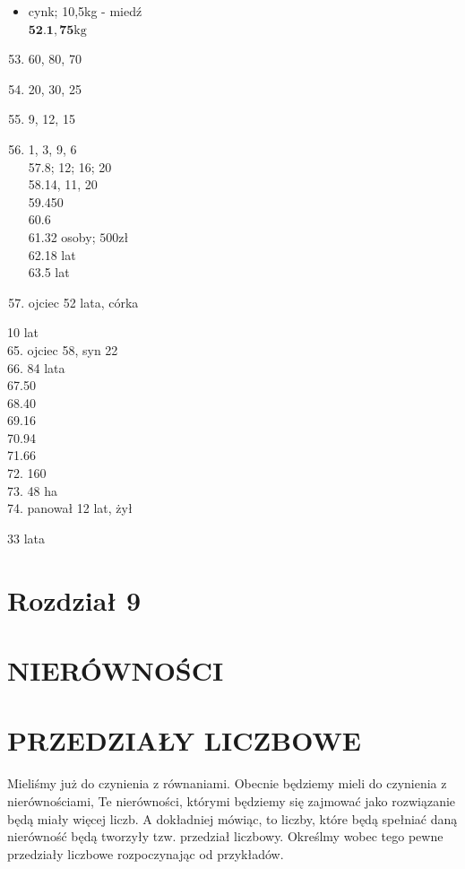 \documentclass[10pt]{article}
\begin{document}
\begin{itemize}
  \item cynk; 10,5kg - miedź\\
\(\mathbf{5 2 . 1 , 7 5 \mathrm { kg }}\)
\end{itemize}

\begin{enumerate}
  \setcounter{enumi}{52}
  \item 60, 80, 70
  \item 20, 30, 25
  \item 9, 12, 15
  \item 1, 3, 9, 6\\
57.8; 12; 16; 20\\
58.14, 11, 20\\
59.450\\
60.6\\
61.32 osoby; \(500 \mathrm{zł}\)\\
62.18 lat\\
63.5 lat
  \item ojciec 52 lata, córka
\end{enumerate}

10 lat\\
65. ojciec 58, syn 22\\
66. 84 lata\\
67.50\\
68.40\\
69.16\\
70.94\\
71.66\\
72. 160\\
73. 48 ha\\
74. panował 12 lat, żył

33 lata

\section*{Rozdział 9}
\section*{NIERÓWNOŚCI}
\section*{PRZEDZIAŁY LICZBOWE}
Mieliśmy już do czynienia z równaniami. Obecnie będziemy mieli do czynienia z nierównościami, Te nierówności, którymi będziemy się zajmować jako rozwiązanie będą miały więcej liczb. A dokładniej mówiąc, to liczby, które będą spełniać daną nierówność będą tworzyły tzw. przedział liczbowy. Określmy wobec tego pewne przedziały liczbowe rozpoczynając od przykładów.
\end{document}
